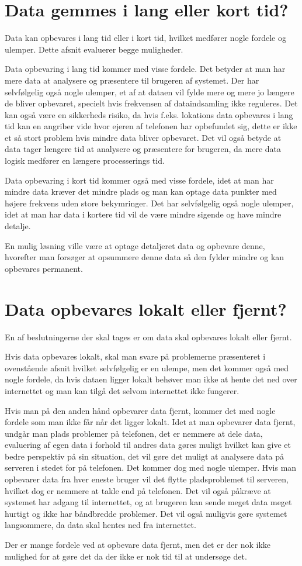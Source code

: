 \section{Data gemmes i lang eller kort tid?}
Data kan opbevares i lang tid eller i kort tid, hvilket medfører nogle fordele og ulemper. Dette afsnit evaluerer begge muligheder.

Data opbevaring i lang tid kommer med visse fordele. Det betyder at man har mere data at analysere og præsentere til brugeren af systemet.  
Der har selvfølgelig også nogle ulemper, et af at dataen vil fylde mere og mere jo længere de bliver opbevaret, specielt hvis frekvensen af dataindsamling ikke reguleres. Det kan også være en sikkerheds risiko, da hvis f.eks. lokations data opbevares i lang tid kan en angriber vide hvor ejeren af telefonen har opbefundet sig, dette er ikke et så stort problem hvis mindre data bliver opbevaret. Det vil også betyde at data tager længere tid at analysere og præsentere for brugeren, da mere data logisk medfører en længere processerings tid.

Data opbevaring i kort tid kommer også med visse fordele, idet at man har mindre data kræver det mindre plads og man kan optage data punkter med højere frekvens uden store bekymringer. %
Det har selvfølgelig også nogle ulemper, idet at man har data i kortere tid vil de være mindre sigende og have mindre detalje. %

En mulig løsning ville være at optage detaljeret data og opbevare denne, hvorefter man forsøger at opsummere denne data så den fylder mindre og kan opbevares permanent. %

\section{Data opbevares lokalt eller fjernt?}
En af beslutningerne der skal tages er om data skal opbevares lokalt eller fjernt. 

Hvis data opbevares lokalt, skal man svare på problemerne præsenteret i ovenstående afsnit hvilket selvfølgelig er en ulempe, men det kommer også med nogle fordele, da hvis dataen ligger lokalt behøver man ikke at hente det ned over internettet og man kan tilgå det selvom internettet ikke fungerer.

Hvis man på den anden hånd opbevarer data fjernt, kommer det med nogle fordele som man ikke får når det ligger lokalt. Idet at man opbevarer data fjernt, undgår man plads problemer på telefonen, det er nemmere at dele data, evaluering af egen data i forhold til andres data gøres muligt hvilket kan give et bedre perspektiv på sin situation, det vil gøre det muligt at analysere data på serveren i stedet for på telefonen. 
Det kommer dog med nogle ulemper. Hvis man opbevarer data fra hver eneste bruger vil det flytte pladsproblemet til serveren, hvilket dog er nemmere at takle end på telefonen. Det vil også påkræve at systemet har adgang til internettet, og at brugeren kan sende meget data meget hurtigt og ikke har båndbredde problemer. Det vil også muligvis gøre systemet langsommere, da data skal hentes ned fra internettet.

Der er mange fordele ved at opbevare data fjernt, men det er der nok ikke mulighed for at gøre det da der ikke er nok tid til at undersøge det.



